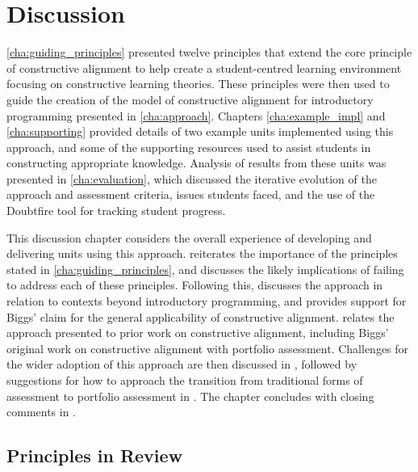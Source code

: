 
\chapter{Discussion} %
\label{cha:discussion}

\graphicspath{{Figures/Discussion/}}

\cref{cha:guiding_principles} presented twelve principles that extend the core principle of constructive alignment to help create a student-centred learning environment focusing on constructive learning theories. These principles were then used to guide the creation of the model of constructive alignment for introductory programming presented in \cref{cha:approach}. Chapters \ref{cha:example_impl} and \ref{cha:supporting} provided details of two example units implemented using this approach, and some of the supporting resources used to assist students in constructing appropriate knowledge. Analysis of results from these units was presented in \cref{cha:evaluation}, which discussed the iterative evolution of the approach and assessment criteria, issues students faced, and the use of the Doubtfire tool for tracking student progress. 

This discussion chapter considers the overall experience of developing and delivering units using this approach.  reiterates the importance of the principles stated in \cref{cha:guiding_principles}, and discusses the likely implications of failing to address each of these principles. Following this,  discusses the approach in relation to contexts beyond introductory programming, and provides support for Biggs' claim for the general applicability of constructive alignment.  relates the approach presented to prior work on constructive alignment, including Biggs' original work on constructive alignment with portfolio assessment. Challenges for the wider adoption of this approach are then discussed in , followed by suggestions for how to approach the transition from traditional forms of assessment to portfolio assessment in . The chapter concludes with closing comments in .

\clearpage

\section{Principles in Review} %
\label{sec:principles_in_review}


